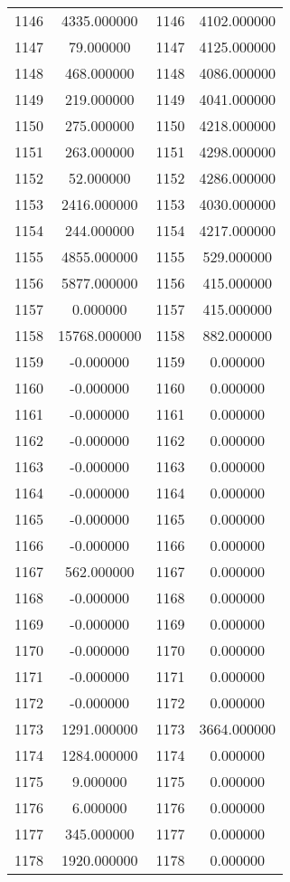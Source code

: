 \documentclass[12pt]{article}
\begin{document}
\begin{longtable}{@{}cccc@{}}
1146 & 4335.000000 & 1146 & 4102.000000 \\
1147 & 79.000000 & 1147 & 4125.000000 \\
1148 & 468.000000 & 1148 & 4086.000000 \\
1149 & 219.000000 & 1149 & 4041.000000 \\
1150 & 275.000000 & 1150 & 4218.000000 \\
1151 & 263.000000 & 1151 & 4298.000000 \\
1152 & 52.000000 & 1152 & 4286.000000 \\
1153 & 2416.000000 & 1153 & 4030.000000 \\
1154 & 244.000000 & 1154 & 4217.000000 \\
1155 & 4855.000000 & 1155 & 529.000000 \\
1156 & 5877.000000 & 1156 & 415.000000 \\
1157 & 0.000000 & 1157 & 415.000000 \\
1158 & 15768.000000 & 1158 & 882.000000 \\
1159 & -0.000000 & 1159 & 0.000000 \\
1160 & -0.000000 & 1160 & 0.000000 \\
1161 & -0.000000 & 1161 & 0.000000 \\
1162 & -0.000000 & 1162 & 0.000000 \\
1163 & -0.000000 & 1163 & 0.000000 \\
1164 & -0.000000 & 1164 & 0.000000 \\
1165 & -0.000000 & 1165 & 0.000000 \\
1166 & -0.000000 & 1166 & 0.000000 \\
1167 & 562.000000 & 1167 & 0.000000 \\
1168 & -0.000000 & 1168 & 0.000000 \\
1169 & -0.000000 & 1169 & 0.000000 \\
1170 & -0.000000 & 1170 & 0.000000 \\
1171 & -0.000000 & 1171 & 0.000000 \\
1172 & -0.000000 & 1172 & 0.000000 \\
1173 & 1291.000000 & 1173 & 3664.000000 \\
1174 & 1284.000000 & 1174 & 0.000000 \\
1175 & 9.000000 & 1175 & 0.000000 \\
1176 & 6.000000 & 1176 & 0.000000 \\
1177 & 345.000000 & 1177 & 0.000000 \\
1178 & 1920.000000 & 1178 & 0.000000 \\

\end{longtable}
\end{document}
